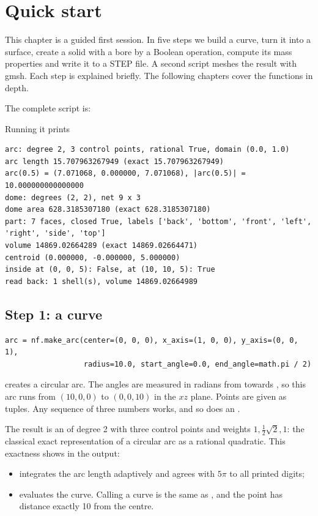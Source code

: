 \chapter{Quick start}\label{ch:quickstart}

This chapter is a guided first session. In five steps we build a curve, turn it into a surface,
create a solid with a bore by a Boolean operation, compute its mass properties and write it to
a STEP file. A second script meshes the result with gmsh. Each step is explained briefly. The
following chapters cover the functions in depth.

The complete script is:


Running it prints

\begin{lstlisting}[style=text]
arc: degree 2, 3 control points, rational True, domain (0.0, 1.0)
arc length 15.707963267949 (exact 15.707963267949)
arc(0.5) = (7.071068, 0.000000, 7.071068), |arc(0.5)| = 10.000000000000000
dome: degrees (2, 2), net 9 x 3
dome area 628.3185307180 (exact 628.3185307180)
part: 7 faces, closed True, labels ['back', 'bottom', 'front', 'left', 'right', 'side', 'top']
volume 14869.02664289 (exact 14869.02664471)
centroid (0.000000, -0.000000, 5.000000)
inside at (0, 0, 5): False, at (10, 10, 5): True
read back: 1 shell(s), volume 14869.02664989
\end{lstlisting}

\section{Step 1: a curve}\label{sec:qs-curve}

\begin{lstlisting}
arc = nf.make_arc(center=(0, 0, 0), x_axis=(1, 0, 0), y_axis=(0, 0, 1),
                  radius=10.0, start_angle=0.0, end_angle=math.pi / 2)
\end{lstlisting}

 creates a circular arc. The angles are measured in radians from
 towards , so this arc runs from $(10,0,0)$ to $(0,0,10)$ in the
$xz$ plane. Points are given as tuples. Any sequence of three numbers works, and so does an
.

The result is an  of degree 2 with three control points and weights
$1, \tfrac12\sqrt2, 1$: the classical exact representation of a circular arc as a rational
quadratic. This exactness shows in the output:
\begin{itemize}
  \item {} integrates the arc length adaptively and agrees with $5\pi$ to all
    printed digits;
  \item {} evaluates the curve. Calling a curve is the same as
    , and the point has distance exactly 10 from the centre.
\end{itemize}

